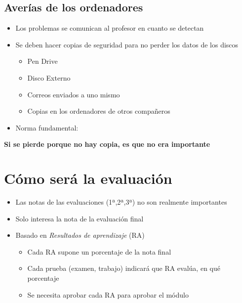 \documentclass[a4paper]{article}
\begin{document}
\subsection{Averías de los ordenadores}
\label{sec:org000000c}
\begin{itemize}
\item Los problemas se comunican al profesor en cuanto se detectan
\item Se deben hacer copias de seguridad para no perder los datos de los discos
\begin{itemize}
\item Pen Drive
\item Disco Externo
\item Correos enviados a uno mismo
\item Copias en los ordenadores de otros compañeros
\end{itemize}
\item Norma fundamental:
\end{itemize}
\textbf{Si se pierde porque no hay copia, es que no era importante}

\section{Cómo será la evaluación}
\label{sec:org0000012}
\begin{itemize}
\item Las notas de las evaluaciones (1ª,2ª,3ª) no son realmente importantes
\item Solo interesa la nota de la evaluación final
\item Basado en \emph{Resultados de aprendizaje} (RA)
\begin{itemize}
\item Cada RA supone un porcentaje de la nota final
\item Cada prueba (examen, trabajo) indicará que RA evalúa, en qué porcentaje
\item Se necesita aprobar cada RA para aprobar el módulo
\end{itemize}
\end{itemize}
\end{document}
